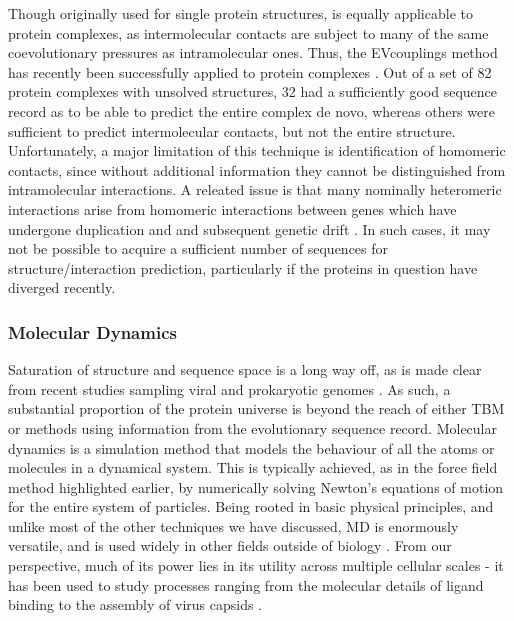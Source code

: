 \documentclass[a4paper,11pt,twoside,openright]{scrbook}
\begin{document}
Though originally used for single protein structures, is equally applicable to protein complexes, as intermolecular contacts are subject to many of the same coevolutionary pressures as intramolecular ones. Thus, the EVcouplings method has recently been successfully applied to protein complexes \cite{Hopf2014}. Out of a set of 82 protein complexes with unsolved structures, 32 had a sufficiently good sequence record as to be able to predict the entire complex de novo, whereas others were sufficient to predict intermolecular contacts, but not the entire structure. Unfortunately, a major limitation of this technique is identification of homomeric contacts, since without additional information they cannot be distinguished  from intramolecular interactions. A releated issue is that many nominally heteromeric interactions arise from homomeric interactions between genes which have undergone duplication and and subsequent genetic drift \cite{Wagner2001,Wagner2003,Fokkens2012}. In such cases, it may not be possible to acquire a sufficient number of sequences for structure/interaction prediction, particularly if the proteins in question have diverged recently.

\subsubsection{Molecular Dynamics}
Saturation of structure and sequence space is a long way off, as is made clear from recent studies sampling viral and prokaryotic genomes \cite{Brum2016,Shi2016,Mukherjee2017}. As such, a substantial proportion of the protein universe is beyond the reach of either TBM or methods using information from the evolutionary sequence record. Molecular dynamics is a simulation method that models the behaviour of all the atoms or molecules in a dynamical system. This is typically achieved, as in the force field method highlighted earlier, by numerically solving Newton's equations of motion for the entire system of particles. Being rooted in basic physical principles, and unlike most of the other techniques we have discussed, MD is enormously versatile, and is used widely in other fields outside of biology \cite{Hu2013,Rapaport2014,Shao2015}. From our perspective, much of its power lies in its utility across multiple cellular scales - it has been used to study processes ranging from the molecular details of ligand binding to the assembly of virus capsids \cite{Buch2011,Zhao2013}.
\end{document}

